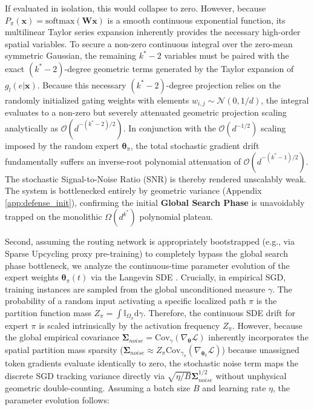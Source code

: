 \documentclass{article}
\newcommand{\1}{\mathbb{I}}
\newcommand{\diff}{\mathrm{d}}
\newcommand{\Loss}{\mathcal{L}}
\newcommand{\calO}{\mathcal{O}}
\newcommand{\bx}{\mathbf{x}}
\newcommand{\btheta}{\boldsymbol{\theta}}
\newcommand{\bW}{\mathbf{W}}
\newcommand{\bSigma}{\boldsymbol{\Sigma}}
\newcommand{\calN}{\mathcal{N}}
\newcommand{\Cov}{\mathrm{Cov}}
\begin{document}
If evaluated in isolation, this would collapse to zero. However, because $P_\pi(\bx) = \text{softmax}(\bW\bx)$ is a smooth continuous exponential function, its multilinear Taylor series expansion inherently provides the necessary high-order spatial variables. To secure a non-zero continuous integral over the zero-mean symmetric Gaussian, the remaining $k^*-2$ variables must be paired with the exact $(k^*-2)$-degree geometric terms generated by the Taylor expansion of $g_l(e|\mathbf{x})$. Because this necessary $(k^*-2)$-degree projection relies on the randomly initialized gating weights with elements $w_{i,j} \sim \calN(0, 1/d)$, the integral evaluates to a non-zero but severely attenuated geometric projection scaling analytically as $\calO(d^{-(k^*-2)/2})$. In conjunction with the $\calO(d^{-1/2})$ scaling imposed by the random expert $\btheta_\pi$, the total stochastic gradient drift fundamentally suffers an inverse-root polynomial attenuation of $\calO(d^{-(k^*-1)/2})$. The stochastic Signal-to-Noise Ratio (SNR) is thereby rendered unscalably weak. The system is bottlenecked entirely by geometric variance (Appendix \ref{app:defense_init}), confirming the initial \textbf{Global Search Phase} is unavoidably trapped on the monolithic $\Omega(d^{k^*})$ polynomial plateau.

Second, assuming the routing network is appropriately bootstrapped (e.g., via Sparse Upcycling proxy pre-training) to completely bypass the global search phase bottleneck, we analyze the continuous-time parameter evolution of the expert weights $\btheta_\pi(t)$ via the Langevin SDE \citep{hu2019mean, sirignano2020mean}. 
Crucially, in empirical SGD, training instances are sampled from the global unconditioned measure $\gamma$. The probability of a random input activating a specific localized path $\pi$ is the partition function mass $Z_{\pi} = \int \1_{\Omega_\pi} \diff\gamma$. Therefore, the continuous SDE drift for expert $\pi$ is scaled intrinsically by the activation frequency $Z_{\pi}$. However, because the global empirical covariance $\bSigma_{noise} = \Cov_\gamma(\nabla_{\btheta} \Loss)$ inherently incorporates the spatial partition mass sparsity ($\bSigma_{noise} \approx Z_{\pi} \Cov_{\gamma_{\pi}}(\nabla_{\btheta_{\pi}} \Loss)$) because unassigned token gradients evaluate identically to zero, the stochastic noise term maps the discrete SGD tracking variance directly via $\sqrt{\eta/B} \bSigma_{noise}^{1/2}$ without unphysical geometric double-counting. Assuming a batch size $B$ and learning rate $\eta$, the parameter evolution follows:
\end{document}
